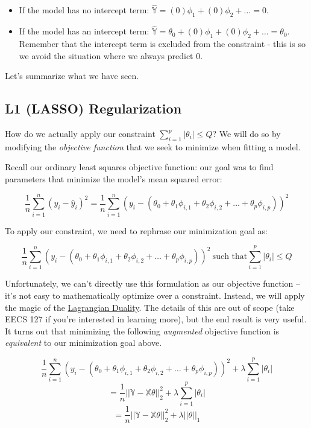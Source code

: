 \documentclass[
  letterpaper,
  DIV=11,
  numbers=noendperiod]{scrreprt}
\providecommand{\tightlist}{%
  \setlength{\itemsep}{0pt}\setlength{\parskip}{0pt}}\usepackage{longtable,booktabs,array}
\begin{document}
\begin{itemize}
\tightlist
\item
  If the model has no intercept term:
  \(\hat{\mathbb{Y}} = (0)\phi_1 + (0)\phi_2 + \ldots = 0\).
\item
  If the model has an intercept term:
  \(\hat{\mathbb{Y}} = \theta_0 + (0)\phi_1 + (0)\phi_2 + \ldots = \theta_0\).
  Remember that the intercept term is excluded from the constraint -
  this is so we avoid the situation where we always predict 0.
\end{itemize}

Let's summarize what we have seen.

\subsection{L1 (LASSO) Regularization}\label{l1-lasso-regularization}

How do we actually apply our constraint
\(\sum_{i=1}^p |\theta_i| \leq Q\)? We will do so by modifying the
\emph{objective function} that we seek to minimize when fitting a model.

Recall our ordinary least squares objective function: our goal was to
find parameters that minimize the model's mean squared error:

\[\frac{1}{n} \sum_{i=1}^n (y_i - \hat{y}_i)^2 = \frac{1}{n} \sum_{i=1}^n (y_i - (\theta_0 + \theta_1 \phi_{i, 1} + \theta_2 \phi_{i, 2} + \ldots + \theta_p \phi_{i, p}))^2\]

To apply our constraint, we need to rephrase our minimization goal as:

\[\frac{1}{n} \sum_{i=1}^n (y_i - (\theta_0 + \theta_1 \phi_{i, 1} + \theta_2 \phi_{i, 2} + \ldots + \theta_p \phi_{i, p}))^2\:\text{such that} \sum_{i=1}^p |\theta_i| \leq Q\]

Unfortunately, we can't directly use this formulation as our objective
function -- it's not easy to mathematically optimize over a constraint.
Instead, we will apply the magic of the
\href{https://en.wikipedia.org/wiki/Duality_(optimization)}{Lagrangian
Duality}. The details of this are out of scope (take EECS 127 if you're
interested in learning more), but the end result is very useful. It
turns out that minimizing the following \emph{augmented} objective
function is \emph{equivalent} to our minimization goal above.

\[\frac{1}{n} \sum_{i=1}^n (y_i - (\theta_0 + \theta_1 \phi_{i, 1} + \theta_2 \phi_{i, 2} + \ldots + \theta_p \phi_{i, p}))^2 + \lambda \sum_{i=1}^p \vert \theta_i \vert\]
\[ = \frac{1}{n}||\mathbb{Y} - \mathbb{X}\theta||_2^2 + \lambda \sum_{i=1}^p |\theta_i|\]
\[ = \frac{1}{n}||\mathbb{Y} - \mathbb{X}\theta||_2^2 + \lambda || \theta ||_1\]
\end{document}

